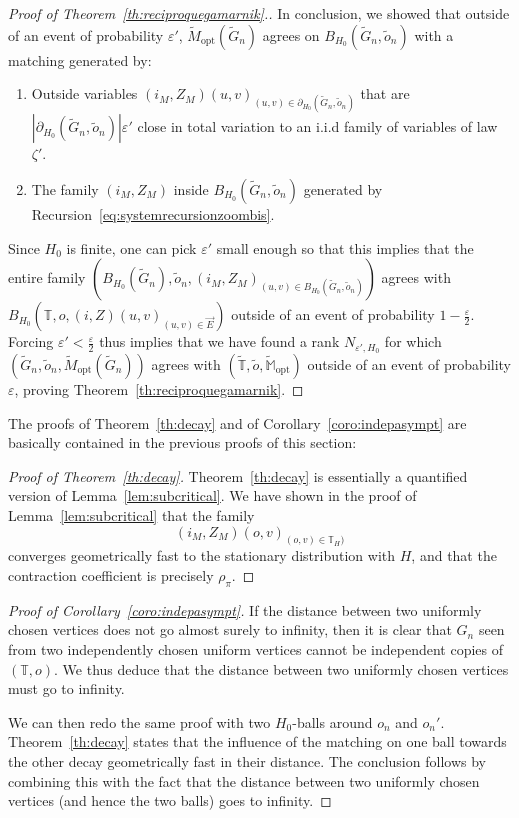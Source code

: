 \documentclass[11pt]{article}
\newcommand{\eps}{\varepsilon}
\begin{document}
\begin{proof}[Proof of Theorem~\ref{th:reciproquegamarnik}.]
In conclusion, we showed that outside of an event of probability $\eps'$, $\tilde{M}_{\mathrm{opt}}(\tilde{G}_n)$ agrees on $B_{H_0}(\tilde{G}_n, \tilde{o}_n)$ with a matching generated by:
\begin{enumerate}
    \item Outside variables $(i_M,Z_M)(u,v)_{(u,v) \in \partial_{H_0}(\tilde{G}_n,\tilde{o}_n)}$ that are $|\partial_{H_0}(\tilde{G}_n,\tilde{o}_n) | \eps'$ close in total variation to an i.i.d family of variables of law $\zeta'$.
    \item The family $(i_M,Z_M)$ inside $B_{H_0}(\tilde{G}_n,\tilde{o}_n)$ generated by Recursion~\eqref{eq:systemrecursionzoombis}.
\end{enumerate}
Since ${H_0}$ is finite, one can pick $\eps'$ small enough so that this implies that the entire family $(B_{H_0}(\tilde{G}_n),\tilde{o}_n,(i_M,Z_M)_{(u,v) \in B_{H_0}(\tilde{G}_n,\tilde{o}_n)})$ agrees with $B_{H_0}(\mathbb{T},o,(i,Z)(u,v)_{(u,v) \in \overset{\rightarrow}{E}})$ outside of an event of probability $1-\tfrac{\eps}{2}$. Forcing $\eps'<\tfrac{\eps}{2}$ thus implies that we have found a rank $N_{\eps',H_0}$ for which $(\tilde{G}_n,\tilde{o}_n,\tilde{M}_{\mathrm{opt}}(\tilde{G}_n))$ agrees with $(\tilde{\mathbb{T}},\tilde{o},\tilde{\mathbb{M}}_{\mathrm{opt}})$ outside of an event of probability $\eps$, proving Theorem~\ref{th:reciproquegamarnik}.
\end{proof}


\bigskip

The proofs of Theorem~\ref{th:decay} and of Corollary~\ref{coro:indepasympt} are basically contained in the previous proofs of this section:


\begin{proof}[Proof of Theorem~\ref{th:decay}]
Theorem~\ref{th:decay} is essentially a quantified version of Lemma~\ref{lem:subcritical}. We have shown in the proof of Lemma~\ref{lem:subcritical} that the family \[ (i_M,Z_M)(o,v)_{(o,v)\in \mathbb{T}_{H})} \] converges geometrically fast to the stationary distribution with $H$, and that the contraction coefficient is precisely $\rho_\pi$.
\end{proof}
\begin{proof}[Proof of Corollary~\ref{coro:indepasympt}]
If the distance between two uniformly chosen vertices does not go almost surely to infinity, then it is clear that $G_n$ seen from two independently chosen uniform vertices cannot be independent copies of $(\mathbb{T},o)$. We thus deduce that the distance between two uniformly chosen vertices must go to infinity.

We can then redo the same proof with two $H_0$-balls around $o_n$ and $o_n'$.
Theorem~\ref{th:decay} states that the influence of the matching on one ball towards the other decay geometrically fast in their distance. The conclusion follows by combining this with the fact that the distance between two uniformly chosen vertices (and hence the two balls) goes to infinity.
\end{proof}
\end{document}
